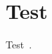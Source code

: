 \documentclass{article}
\begin{document}
\section{Test}
Test~\cite{li2018fuzzing}.



\end{document}
